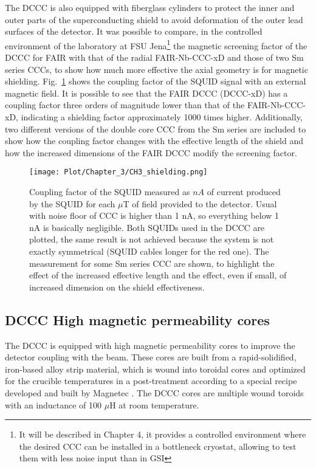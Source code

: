 \documentclass[12pt,a4paper]{report}
\begin{document}
       The DCCC is also equipped with fiberglass cylinders to protect the inner and outer parts of the superconducting shield to avoid deformation of the outer lead surfaces of the detector. It was possible to compare, in the controlled environment of the laboratory at FSU Jena\footnote{It will be described in Chapter 4, it provides a controlled environment where the desired CCC can be installed in a bottleneck cryostat, allowing to test them with less noise input than in GSI} the magnetic screening factor of the DCCC for FAIR with that of the radial FAIR-Nb-CCC-xD and those of two Sm series CCCs, to show how much more effective the axial geometry is for magnetic shielding. Fig.~\ref{CH3_screening_factor} shows the coupling factor of the SQUID signal with an external magnetic field. It is possible to see that the FAIR DCCC (DCCC-xD) has a coupling factor three orders of magnitude lower than that of the FAIR-Nb-CCC-xD, indicating a shielding factor approximately 1000 times higher. Additionally, two different versions of the double core CCC from the Sm series are included to show how the coupling factor changes with the effective length of the shield and how the increased dimensions of the FAIR DCCC modify the screening factor.
       \begin{figure}[H]
       	\centering
       	\texttt{[image: Plot/Chapter\_3/CH3\_shielding.png]}
       	\caption{\small{Coupling factor of the SQUID measured as $nA$ of current produced by the SQUID for each $\mu$T of field provided to the detector. Usual with noise floor of CCC is higher than 1 nA, so everything below 1 nA is basically negligible. Both SQUIDs used in the DCCC are plotted, the same result is not achieved because the system is not exactly symmetrical (SQUID cables longer for the red one). The measurement for some Sm series CCC are shown, to highlight the effect of the increased effective length and the effect, even if small, of increased dimension on the shield effectiveness.}}
       	\label{CH3_screening_factor}
       \end{figure}
       \subsection{DCCC High magnetic permeability cores}
       The DCCC is equipped with high magnetic permeability cores to improve the detector coupling with the beam. These cores are built from a rapid-solidified, iron-based alloy strip material, which is wound into toroidal cores and optimized for the crucible temperatures in a post-treatment according to a special recipe developed and built by Magnetec \cite{Volker_IEEE}. The DCCC cores are multiple wound toroids with an inductance of 100 $\mu$H at room temperature.
       
\end{document}
